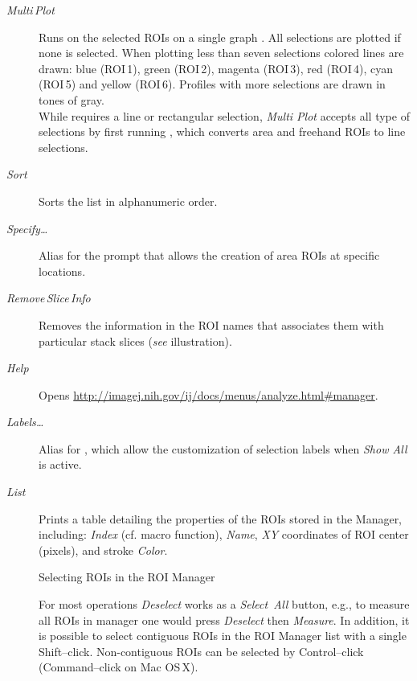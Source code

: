 \begin{description}
\item [{\emph{Multi\,Plot}}] \improvement{}Runs 
on the selected ROIs on a single graph \cite{C-RM-MultiPlot}. All
selections are plotted if none is selected. When plotting less than
seven selections colored lines are drawn: blue (ROI\,1), green (ROI\,2),
magenta (ROI\,3), red (ROI\,4), cyan (ROI\,5) and yellow (ROI\,6).
Profiles with more selections are drawn in tones of gray.\\
While 
requires a line or rectangular selection, \emph{Multi Plot} accepts
all type of selections by first running ,
which converts area and freehand ROIs to line selections.
\item [{\emph{Sort}}] Sorts the list in alphanumeric order.
\item [{\emph{Specify\ldots{}}}] Alias for the 
prompt that allows the creation of area ROIs at specific locations.
\item [{\emph{\label{misc:RM-RemoveSliceInfo}Remove\,Slice\,Info}}] Removes
the information in the ROI names that associates them with particular
stack slices (\emph{see}  illustration).
\item [{\emph{Help}}] Opens \href{http://imagej.nih.gov/ij/docs/menus/analyze.html\#manager}{http://imagej.nih.gov/ij/docs/menus/analyze.html\#{}manager}.
\item [{\emph{Labels\ldots{}}}] Alias for ,
which allow the customization of selection labels when \emph{Show
All} is active.
\item [{\emph{List}}] Prints
a table detailing the properties of the ROIs stored in the Manager,
including: \emph{Index} (cf. 
macro function), \emph{Name}, \emph{XY} coordinates of ROI center
(pixels), and stroke \emph{Color}.
\begin{infobox}[h]
\caption{\label{infobox:ROIManager}Selecting ROIs in the ROI Manager}


\noindent For most  operations \emph{Deselect}
works as a \emph{Select~All }button, e.g., to measure all ROIs in
manager one would press \emph{Deselect} then \emph{Measure}. In addition,
it is possible to select contiguous ROIs in the ROI Manager list with
a single Shift--click. Non-contiguous ROIs can be selected by Control--click
(Command--click on Mac OS\,X).\medskip{}



\end{infobox}
\end{description}
